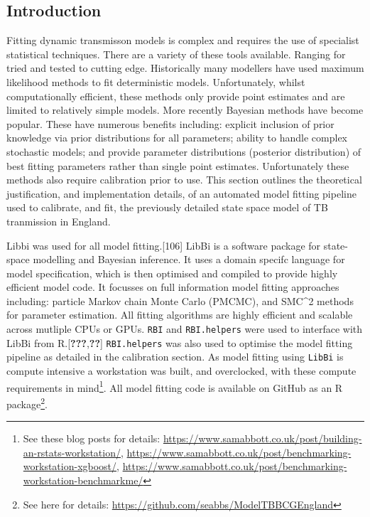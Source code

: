 \documentclass[11pt,twoside]{bristolthesis}
\begin{document}
  \hypertarget{introduction-8}{%
  \subsection{Introduction}\label{introduction-8}}
  
  Fitting dynamic transmisson models is complex and requires the use of specialist statistical techniques. There are a variety of these tools available. Ranging for tried and tested to cutting edge. Historically many modellers have used maximum likelihood methods to fit deterministic models. Unfortunately, whilst computationally efficient, these methods only provide point estimates and are limited to relatively simple models. More recently Bayesian methods have become popular. These have numerous benefits including: explicit inclusion of prior knowledge via prior distributions for all parameters; ability to handle complex stochastic models; and provide parameter distributions (posterior distribution) of best fitting parameters rather than single point estimates. Unfortunately these methods also require calibration prior to use. This section outlines the theoretical justification, and implementation details, of an automated model fitting pipeline used to calibrate, and fit, the previously detailed state space model of TB tranmission in England.
  
  Libbi was used for all model fitting.{[}106{]} LibBi is a software package for state-space modelling and Bayesian inference. It uses a domain specifc language for model specification, which is then optimised and compiled to provide highly efficient model code. It focusses on full information model fitting approaches including: particle Markov chain Monte Carlo (PMCMC), and SMC\^{}2 methods for parameter estimation. All fitting algorithms are highly efficient and scalable across mutliple CPUs or GPUs. \texttt{RBI} and \texttt{RBI.helpers} were used to interface with LibBi from R.{[}{\textbf{???}},{\textbf{??}}{]} \texttt{RBI.helpers} was also used to optimise the model fitting pipeline as detailed in the calibration section. As model fitting using \texttt{LibBi} is compute intensive a workstation was built, and overclocked, with these compute requirements in mind\footnote{See these blog posts for details: \url{https://www.samabbott.co.uk/post/building-an-rstats-workstation/}, \url{https://www.samabbott.co.uk/post/benchmarking-workstation-xgboost/}, \url{https://www.samabbott.co.uk/post/benchmarking-workstation-benchmarkme/}}. All model fitting code is available on GitHub as an R package\footnote{See here for details: \url{https://github.com/seabbs/ModelTBBCGEngland}}.
  
\end{document}
